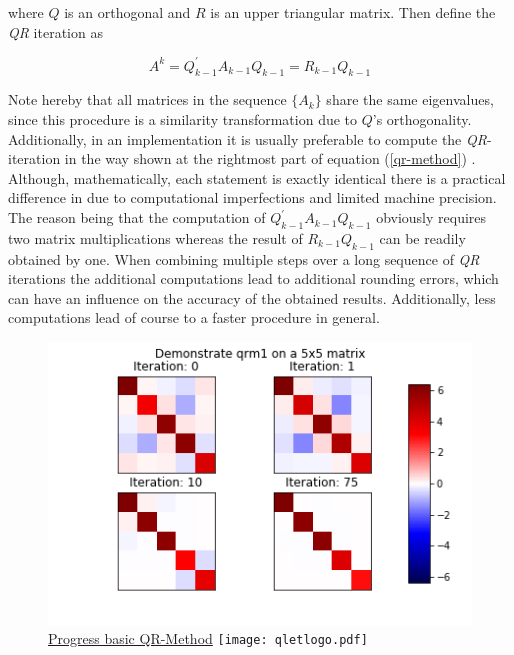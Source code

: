 \documentclass[12pt]{article}
\begin{document}
where $Q$ is an orthogonal and $R$ is an upper triangular matrix. Then define the \textit{QR} iteration as

\begin{equation}
\label{qr-method}
  A^k = Q_{k-1}^{\prime} A_{k-1} Q_{k-1} = R_{k-1}Q_{k-1}
\end{equation}

Note hereby that all matrices in the sequence $\{A_k\}$ share the same eigenvalues, since this procedure is a similarity transformation due to $Q$'s orthogonality. Additionally, in an implementation it is usually preferable to compute the \textit{QR}-iteration in the way shown at the rightmost part of equation (\ref{qr-method}) \cite{NME}. Although, mathematically, each statement is exactly identical there is a practical difference in due to computational imperfections and limited machine precision. The reason being that the computation of $Q_{k-1}^{\prime} A_{k-1} Q_{k-1}$ obviously requires two matrix multiplications whereas the result of $R_{k-1}Q_{k-1}$ can be readily obtained by one. When combining multiple steps over a long sequence of \textit{QR} iterations the additional computations lead to additional rounding errors, which can have an influence on the accuracy of the obtained results. Additionally, less computations lead of course to a faster procedure in general. 

\begin{figure}
\begin{center}
\label{qrm1-plot}
\caption{\href {https://github.com/thsis/NIS18/tree/master/media/plots}{Progress basic QR-Method}  \protect\texttt{[image: qletlogo.pdf]}}
  \includegraphics[scale=0.6]{../media/plots/qrm1.png}
\end{center}
\end{figure}
\end{document}
